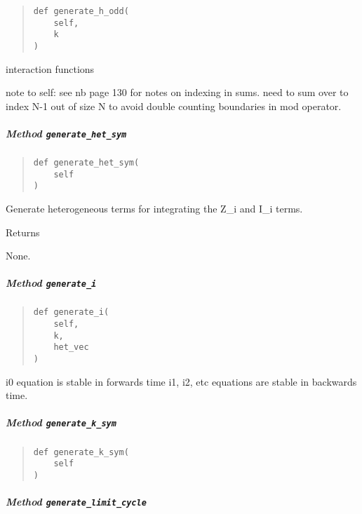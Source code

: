 \documentclass[
  english,
  a4paper,
  oneside]{article}
\begin{document}
\begin{quote}
\begin{verbatim}
def generate_h_odd(
    self,
    k
)
\end{verbatim}
\end{quote}

interaction functions

note to self: see nb page 130 for notes on indexing in sums. need to sum
over to index N-1 out of size N to avoid double counting boundaries in
mod operator.

\hypertarget{StrongCoupling.StrongCoupling.generate_het_sym}{%
\subparagraph{\texorpdfstring{Method
\texttt{generate\_het\_sym}}{Method generate\_het\_sym}}\label{StrongCoupling.StrongCoupling.generate_het_sym}}

\begin{quote}
\begin{verbatim}
def generate_het_sym(
    self
)
\end{verbatim}
\end{quote}

Generate heterogeneous terms for integrating the Z\_i and I\_i terms.

Returns

None.

\hypertarget{StrongCoupling.StrongCoupling.generate_i}{%
\subparagraph{\texorpdfstring{Method
\texttt{generate\_i}}{Method generate\_i}}\label{StrongCoupling.StrongCoupling.generate_i}}

\begin{quote}
\begin{verbatim}
def generate_i(
    self,
    k,
    het_vec
)
\end{verbatim}
\end{quote}

i0 equation is stable in forwards time i1, i2, etc equations are stable
in backwards time.

\hypertarget{StrongCoupling.StrongCoupling.generate_k_sym}{%
\subparagraph{\texorpdfstring{Method
\texttt{generate\_k\_sym}}{Method generate\_k\_sym}}\label{StrongCoupling.StrongCoupling.generate_k_sym}}

\begin{quote}
\begin{verbatim}
def generate_k_sym(
    self
)
\end{verbatim}
\end{quote}

\hypertarget{StrongCoupling.StrongCoupling.generate_limit_cycle}{%
\subparagraph{\texorpdfstring{Method
\texttt{generate\_limit\_cycle}}{Method generate\_limit\_cycle}}\label{StrongCoupling.StrongCoupling.generate_limit_cycle}}
\end{document}
